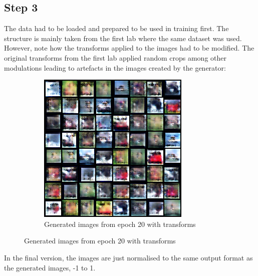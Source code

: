 \subsection{Step 3}
The data had to be loaded and prepared to be used in training first. The structure is mainly taken from the first lab where the same dataset was used. However, note how the transforms applied to the images had to be modified. The original transforms from the first lab applied random crops among other modulations leading to artefacts in the images created by the generator:
\begin{figure}[H]
    \centering
    \begin{subfigure}[t]{0.48\textwidth}
        \centering
        \includegraphics[width=\textwidth]{images/ex_2/try_1/epoch_20}
        \caption{Generated images from epoch 20 with transforms}
    \end{subfigure}
    \hfill
\end{figure}
In the final version, the images are just normalised to the same output format as the generated images, -1 to 1. \\



